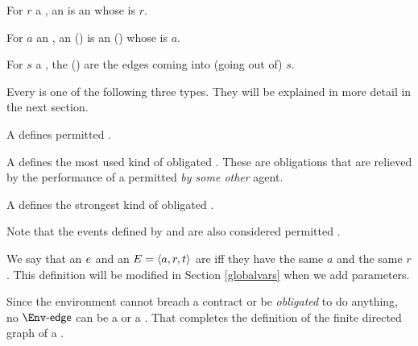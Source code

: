 \documentclass[12pt]{article}
\begin{document}
\newcommand{\atransition}{an \transition}

\begin{LPPI}
\item For $r$ a \Role, an  is \atransition whose \Role is $r$.
\item For $a$ an \Action, an  () is an \Event (\transition) whose \Action is $a$.
\item For $s$ a \State, the  () are the edges coming into (going out of) $s$.
\end{LPPI}
Every \transition is one of the following three types. They will be explained in more detail in the next section.
\begin{LPPI}
\item A  defines permitted \Events.
\item A  defines the most used kind of obligated \Events. These are obligations that are relieved by the performance of a permitted {\Event} {\it by some other} agent.
\item A  defines the strongest kind of obligated \Events.
\end{LPPI}
Note that the events defined by \rmustntrans and \mustntrans are also considered permitted \Events.

We say that \atransition $e$ and an \Event $E = \langle a,r,t\rangle$ are  iff they have the same \Action $a$ and the same \Role $r$. This definition will be modified in Section \ref{globalvars} when we add \Event parameters.
\medskip





Since the environment \Env cannot breach a contract or be {\it obligated} to do anything, no $\depTrans{\Env}$ can be a \mustntran or a \rmustntran.
That completes the definition of the finite directed graph \skeleton of a \Contract.
\end{document}

